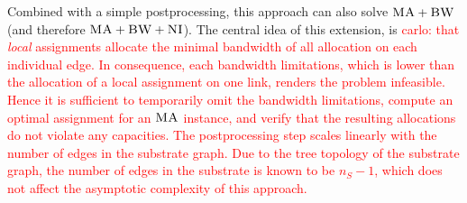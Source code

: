 \documentclass[9pt]{sigcomm-alternate}
\newcommand{\carlo}[1]{\textcolor{red}{carlo: #1}}
\newcommand{\VmChunkAssignment}{\mu}
\newcommand{\VirtualNode}{v}
\newcommand{\achunk}{\ensuremath{c}}
\newcommand{\CC}{\textsc{NI}}
\newcommand{\BW}{\textsc{BW}}
\newcommand{\MA}{\textsc{MA}}
\begin{document}

Combined with a simple postprocessing, this approach can also solve $\MA+\BW$
(and therefore $\MA+\BW+\CC$). The central idea of this extension, is
\carlo{that \emph{local} assignments allocate the minimal bandwidth of all
allocation on each individual edge. In consequence, each bandwidth limitations,
which is lower than the allocation of a local assignment on one link, renders
the problem infeasible. Hence it is sufficient to temporarily omit the
bandwidth limitations, compute an optimal assignment for an $\MA$ instance, and
verify that the resulting allocations do not violate any capacities. The
postprocessing step scales linearly with the number of edges in the substrate
graph. Due to the tree topology of the substrate graph, the number of
edges in the substrate is known to be $n_S - 1$, which does not affect the
asymptotic complexity of this approach.}
\end{document}
